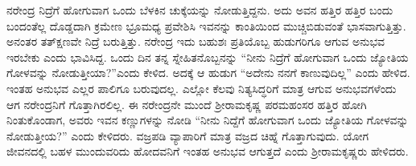 ನರೇಂದ್ರ ನಿದ್ರೆಗೆ ಹೋಗುವಾಗ ಒಂದು ಬೆಳಕಿನ ಚುಕ್ಕೆಯನ್ನು ನೋಡುತ್ತಿದ್ದನು. ಅದು ಅವನ ಹತ್ತಿರ ಹತ್ತಿರ ಬಂದು ಬಂದಂತೆಲ್ಲ ದೊಡ್ಡದಾಗಿ ಕ್ರಮೇಣ ಭ್ರೂಮಧ್ಯ ಪ್ರವೇಶಿಸಿ ಇವನನ್ನು ಕಾಂತಿಯಿಂದ ಮುಚ್ಚಿಬಿಡುವಂತೆ ಭಾಸವಾಗುತ್ತಿತ್ತು. ಅನಂತರ ತತ್‍ಕ್ಷಣವೇ ನಿದ್ರೆ ಬರುತ್ತಿತ್ತು. ನರೇಂದ್ರ ಇದು ಬಹುಶಃ ಪ್ರತಿಯೊಬ್ಬ ಹುಡುಗರಿಗೂ ಆಗುವ ಅನುಭವ ಇರಬೇಕು ಎಂದು ಭಾವಿಸಿದ್ದ. ಒಂದು ದಿನ ತನ್ನ ಸ್ನೇಹಿತನೊಬ್ಬನನ್ನು “ನೀನು ನಿದ್ರೆಗೆ ಹೋಗುವಾಗ ಒಂದು ಜ್ಯೋತಿಯ ಗೋಳವನ್ನು ನೋಡುತ್ತೀಯಾ?”ಎಂದು ಕೇಳಿದ. ಅದಕ್ಕೆ ಆ ಹುಡುಗ “ಅದೇನು ನನಗೆ ಕಾಣುವುದಿಲ್ಲ” ಎಂದು ಹೇಳಿದ. ಇಂತಹ ಅನುಭವ ಎಲ್ಲರ ಪಾಲಿಗೂ ಬರುವುದಲ್ಲ. ಎಲ್ಲೋ ಕೆಲವು ನಿತ್ಯಸಿದ್ಧರಿಗೆ ಮಾತ್ರ ಆಗುವ ಅನುಭವಗಳೆಂದು ಆಗ ನರೇಂದ್ರನಿಗೆ ಗೊತ್ತಾಗಿರಲಿಲ್ಲ. ಈ ನರೇಂದ್ರನೇ ಮುಂದೆ ಶ‍್ರೀರಾಮಕೃಷ್ಣ ಪರಮಹಂಸರ ಹತ್ತಿರ ಹೋಗಿ ನಿಂತುಕೊಂಡಾಗ, ಅವರು ಇವನ ಕಣ್ಣುಗಳನ್ನು ನೋಡಿ “ನೀನು ನಿದ್ದೆಗೆ ಹೋಗುವಾಗ ಒಂದು ಜ್ಯೋತಿಯ ಗೋಳವನ್ನು ನೋಡುತ್ತೀಯ?” ಎಂದು ಕೇಳಿದರು. ವಜ್ರಪಡಿ ವ್ಯಾಪಾರಿಗೆ ಮಾತ್ರ ವಜ್ರದ ಚಿಹ್ನೆ ಗೊತ್ತಾಗುವುದು. ಯೋಗ ಜೀವನದಲ್ಲಿ ಬಹಳ ಮುಂದುವರಿದು ಹೋದವನಿಗೆ ಇಂತಹ ಅನುಭವ ಆಗುತ್ತದೆ ಎಂದು ಶ‍್ರೀರಾಮಕೃಷ್ಣರು ಹೇಳಿದರು.

